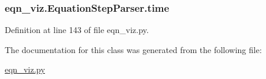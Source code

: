 \subsubsection[{time}]{\setlength{\rightskip}{0pt plus 5cm}eqn\+\_\+viz.\+Equation\+Step\+Parser.\+time}\label{classeqn__viz_1_1_equation_step_parser_af3fdecc987d26e93a0a0944c4e634fe3}


Definition at line 143 of file eqn\+\_\+viz.\+py.



The documentation for this class was generated from the following file\+:\begin{DoxyCompactItemize}
\item 
\hyperlink{eqn__viz_8py}{eqn\+\_\+viz.\+py}\end{DoxyCompactItemize}
